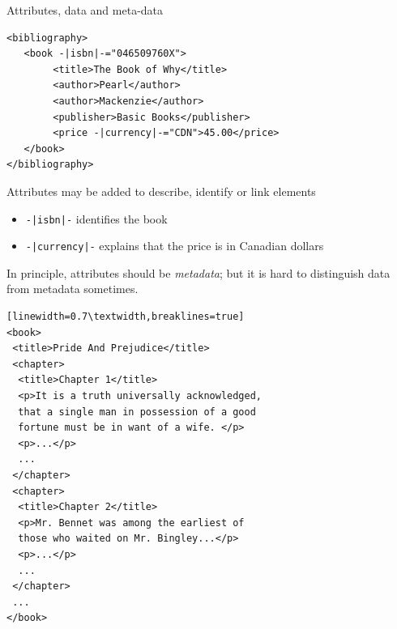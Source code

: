 \begin{frame}[fragile]{Attributes, data and meta-data}

\begin{center}
\footnotesize
\begin{lstlisting}[style=markup]
<bibliography> 
   <book -|isbn|-="046509760X">
        <title>The Book of Why</title>
        <author>Pearl</author>
        <author>Mackenzie</author>
        <publisher>Basic Books</publisher>
        <price -|currency|-="CDN">45.00</price>
   </book>
</bibliography>
\end{lstlisting}
\end{center}

Attributes may be added to describe, identify or \alert{link} elements
\begin{itemize}[-,noitemsep]
\item \lstinline{-|isbn|-} identifies the book
\item \lstinline{-|currency|-} explains that the price is in Canadian dollars
\end{itemize}

In principle, attributes should be \emph{metadata}; but it is hard to distinguish data from metadata sometimes.
\end{frame}



\newsavebox\PandPXML
\begin{lrbox}{\PandPXML}
\begin{lstlisting}[style=markup][linewidth=0.7\textwidth,breaklines=true]
<book>
 <title>Pride And Prejudice</title>
 <chapter>
  <title>Chapter 1</title>
  <p>It is a truth universally acknowledged, 
  that a single man in possession of a good 
  fortune must be in want of a wife. </p>
  <p>...</p>
  ...
 </chapter>
 <chapter>
  <title>Chapter 2</title>
  <p>Mr. Bennet was among the earliest of 
  those who waited on Mr. Bingley...</p>
  <p>...</p>
  ...
 </chapter>
 ...
</book>
\end{lstlisting}
\end{lrbox}

